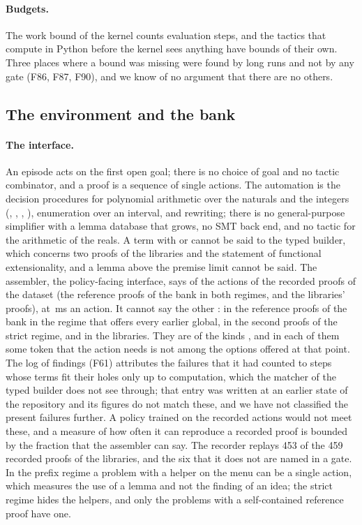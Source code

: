 \paragraph{Budgets.}
The work bound of the kernel counts evaluation steps, and the tactics that compute in Python before the kernel sees anything have bounds of their own.
Three places where a bound was missing were found by long runs and not by any gate (F86, F87, F90), and we know of no argument that there are no others.

\subsection{The environment and the bank}

\paragraph{The interface.}
An episode acts on the first open goal; there is no choice of goal and no tactic combinator, and a proof is a sequence of single actions.
The automation is the decision procedures for polynomial arithmetic over the naturals and the integers (, , , ), enumeration over an interval, and rewriting; there is no general-purpose simplifier with a lemma database that grows, no SMT back end, and no tactic for the arithmetic of the reals.
A term with  or  cannot be said to the typed builder, which concerns two proofs of the libraries and the statement of functional extensionality, and a lemma above the premise limit cannot be said.
The assembler, the policy-facing interface, says \asmSaid{} of the \asmActions{} actions of the \asmProofs{} recorded proofs of the dataset (the reference proofs of the bank in both regimes, and the libraries' proofs), at \asmMsPerAction\,ms an action.
It cannot say the other \asmMissing{}: \asmPrefixMissing{} in the reference proofs of the bank in the regime that offers every earlier global, \asmStrictMissing{} in the second proofs of the strict regime, and \asmLibMissing{} in the libraries.
They are of the kinds \asmMissingKinds{}, and in each of them some token that the action needs is not among the options offered at that point.
The log of findings (F61) attributes the failures that it had counted to steps whose terms fit their holes only up to computation, which the matcher of the typed builder does not see through; that entry was written at an earlier state of the repository and its figures do not match these, and we have not classified the present failures further.
A policy trained on the recorded actions would not meet these, and a measure of how often it can reproduce a recorded proof is bounded by the fraction that the assembler can say.
The recorder replays 453 of the 459 recorded proofs of the libraries, and the six that it does not are named in a gate.
In the prefix regime a problem with a helper on the menu can be a single action, which measures the use of a lemma and not the finding of an idea; the strict regime hides the helpers, and only the problems with a self-contained reference proof have one.

